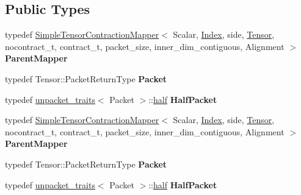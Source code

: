 \subsection*{Public Types}
\begin{DoxyCompactItemize}
\item 
\mbox{\label{class_eigen_1_1internal_1_1_base_tensor_contraction_mapper_ad9bd19a6c7c8dac105ffc74c5b381a80}} 
typedef \hyperlink{class_eigen_1_1internal_1_1_simple_tensor_contraction_mapper}{Simple\+Tensor\+Contraction\+Mapper}$<$ Scalar, \hyperlink{namespace_eigen_a62e77e0933482dafde8fe197d9a2cfde}{Index}, side, \hyperlink{class_eigen_1_1_tensor}{Tensor}, nocontract\+\_\+t, contract\+\_\+t, packet\+\_\+size, inner\+\_\+dim\+\_\+contiguous, Alignment $>$ {\bfseries Parent\+Mapper}
\item 
\mbox{\label{class_eigen_1_1internal_1_1_base_tensor_contraction_mapper_a368cf313bea3f39e4bf86e7d0131c9fb}} 
typedef Tensor\+::\+Packet\+Return\+Type {\bfseries Packet}
\item 
\mbox{\label{class_eigen_1_1internal_1_1_base_tensor_contraction_mapper_a8f37374e5a116772a53af6b262844660}} 
typedef \hyperlink{struct_eigen_1_1internal_1_1unpacket__traits}{unpacket\+\_\+traits}$<$ Packet $>$\+::\hyperlink{struct_eigen_1_1half}{half} {\bfseries Half\+Packet}
\item 
\mbox{\label{class_eigen_1_1internal_1_1_base_tensor_contraction_mapper_ad9bd19a6c7c8dac105ffc74c5b381a80}} 
typedef \hyperlink{class_eigen_1_1internal_1_1_simple_tensor_contraction_mapper}{Simple\+Tensor\+Contraction\+Mapper}$<$ Scalar, \hyperlink{namespace_eigen_a62e77e0933482dafde8fe197d9a2cfde}{Index}, side, \hyperlink{class_eigen_1_1_tensor}{Tensor}, nocontract\+\_\+t, contract\+\_\+t, packet\+\_\+size, inner\+\_\+dim\+\_\+contiguous, Alignment $>$ {\bfseries Parent\+Mapper}
\item 
\mbox{\label{class_eigen_1_1internal_1_1_base_tensor_contraction_mapper_a368cf313bea3f39e4bf86e7d0131c9fb}} 
typedef Tensor\+::\+Packet\+Return\+Type {\bfseries Packet}
\item 
\mbox{\label{class_eigen_1_1internal_1_1_base_tensor_contraction_mapper_a8f37374e5a116772a53af6b262844660}} 
typedef \hyperlink{struct_eigen_1_1internal_1_1unpacket__traits}{unpacket\+\_\+traits}$<$ Packet $>$\+::\hyperlink{struct_eigen_1_1half}{half} {\bfseries Half\+Packet}
\end{DoxyCompactItemize}
